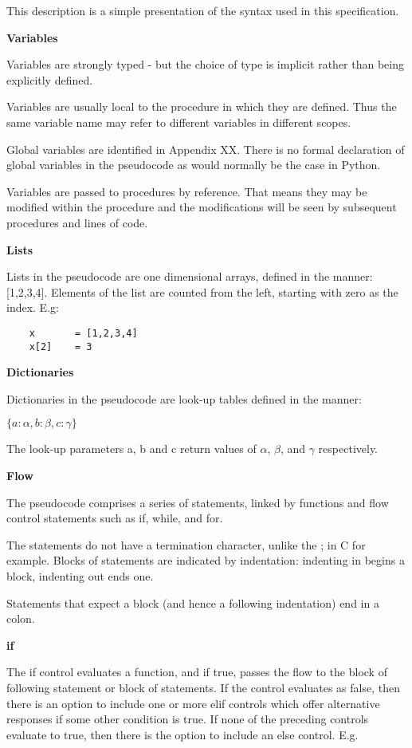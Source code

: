 This description is a simple presentation of the syntax used in this
specification.

\textbf{Variables}

Variables are strongly typed - but the choice of type is implicit rather
than being explicitly defined.

Variables are usually local to the procedure in which they are defined.
Thus the same variable name may refer to different variables in
different scopes.

Global variables are identified in Appendix XX. There is no formal
declaration of global variables in the pseudocode as would normally be
the case in Python.

Variables are passed to procedures by reference. That means they may be
modified within the procedure and the modifications will be seen by
subsequent procedures and lines of code.

\textbf{Lists}

Lists in the pseudocode are one dimensional arrays, defined in the
manner: [1,2,3,4]. Elements of the list are counted from the left,
starting with zero as the index. E.g:

\begin{verbatim}
	x 		= [1,2,3,4]
	x[2] 	= 3
\end{verbatim}

\textbf{Dictionaries}

Dictionaries in the pseudocode are look-up tables defined in the manner:

$\lbrace a: \alpha , b: \beta, c: \gamma \rbrace$

The look-up parameters a, b and c return values of $\alpha$, $\beta$,
and $\gamma$  respectively.

\textbf{Flow}

The pseudocode comprises a series of statements, linked by functions and
flow control statements such as if, while, and for.

The statements do not have a termination character, unlike the ; in C
for example.  Blocks of statements are indicated by indentation:
indenting in begins a block, indenting out ends one.

Statements that expect a block (and hence a following indentation) end
in a colon.

\textbf{if}

The if control evaluates a function, and if true, passes the flow to the
block of following statement or block of statements. If the control
evaluates as false, then there is an option to include one or more elif
controls which offer alternative responses if some other condition is
true.  If none of the preceding controls evaluate to true, then there is
the option to include an else control. E.g.


